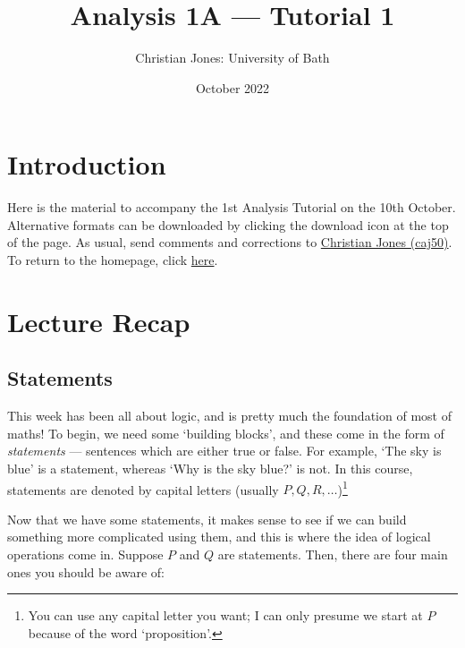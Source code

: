 \documentclass[
  12pt,
  a4paper]{extarticle}
\title{Analysis 1A --- Tutorial 1}
\author{Christian Jones: University of Bath}
\date{October 2022}
\theoremstyle{plain}
\theoremstyle{definition}
\theoremstyle{plain}
\theoremstyle{plain}
\theoremstyle{plain}
\theoremstyle{plain}
\theoremstyle{definition}
\theoremstyle{definition}
\newtheorem*{Order Axioms*}{Order Axioms}\newtheorem{Order Axioms}{Order Axioms}[section]
\theoremstyle{remark}
\theoremstyle{remark}
\renewcommand{\;}{\,}
\begin{document}
\maketitle

{
\setcounter{tocdepth}{2}
\tableofcontents
}
\newpage
{}

\hypertarget{introduction}{%
\section*{Introduction}\label{introduction}}

Here is the material to accompany the 1st Analysis Tutorial on the 10th October. Alternative formats can be downloaded by clicking the download icon at the top of the page. As usual, send comments and corrections to \href{mailto:caj50@bath.ac.uk}{Christian Jones (caj50)}. To return to the homepage, click \href{http://caj50.github.io/tutoring.html}{here}.

\hypertarget{lecture-recap}{%
\section{Lecture Recap}\label{lecture-recap}}

\hypertarget{statements}{%
\subsection{Statements}\label{statements}}

This week has been all about logic, and is pretty much the foundation of most of maths! To begin, we need some `building blocks', and these come in the form of \emph{statements} --- sentences which are either true or false. For example, \color{blue} `The sky is blue' \color{black} is a statement, whereas \color{red} `Why is the sky blue?' \color{black} is not. In this course, statements are denoted by capital letters (usually \(P,Q,R,\ldots\))\footnote{You can use any capital letter you want; I can only presume we start at \(P\) because of the word `proposition'.}

Now that we have some statements, it makes sense to see if we can build something more complicated using them, and this is where the idea of logical operations come in. Suppose \(P\) and \(Q\) are statements. Then, there are four main ones you should be aware of:
\end{document}
